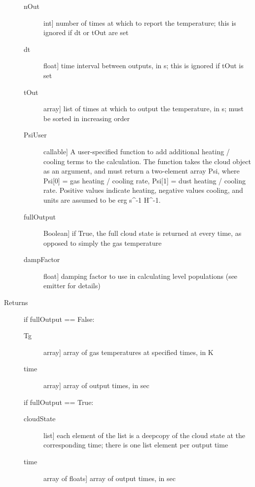 \documentclass[letterpaper,10pt,english]{sphinxmanual}
\begin{document}
\begin{fulllineitems}
\begin{fulllineitems}
\begin{description}
\begin{description}
\item[{nOut}] \leavevmode{[}int{]}
number of times at which to report the temperature; this
is ignored if dt or tOut are set

\item[{dt}] \leavevmode{[}float{]}
time interval between outputs, in s; this is ignored if
tOut is set

\item[{tOut}] \leavevmode{[}array{]}
list of times at which to output the temperature, in s;
must be sorted in increasing order

\item[{PsiUser}] \leavevmode{[}callable{]}
A user-specified function to add additional heating /
cooling terms to the calculation. The function takes the
cloud object as an argument, and must return a two-element
array Psi, where Psi{[}0{]} = gas heating / cooling rate,
Psi{[}1{]} = dust heating / cooling rate. Positive values
indicate heating, negative values cooling, and units are
assumed to be erg s\textasciicircum{}-1 H\textasciicircum{}-1.

\item[{fullOutput}] \leavevmode{[}Boolean{]}
if True, the full cloud state is returned at every time,
as opposed to simply the gas temperature

\item[{dampFactor}] \leavevmode{[}float{]}
damping factor to use in calculating level populations
(see emitter for details)

\end{description}

\item[{Returns}] \leavevmode
if fullOutput == False:
\begin{description}
\item[{Tg}] \leavevmode{[}array{]}
array of gas temperatures at specified times, in K

\item[{time}] \leavevmode{[}array{]}
array of output times, in sec

\end{description}

if fullOutput == True:
\begin{description}
\item[{cloudState}] \leavevmode{[}list{]}
each element of the list is a deepcopy of the cloud
state at the corresponding time; there is one list
element per output time

\item[{time}] \leavevmode{[}array of floats{]}
array of output times, in sec


\end{description}
\end{description}
\end{fulllineitems}
\end{fulllineitems}
\end{document}
